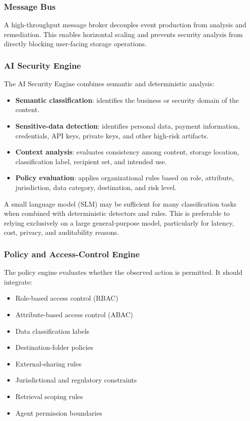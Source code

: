 \documentclass[conference]{IEEEtran}
\begin{document}
\subsubsection{Message Bus}

A high-throughput message broker decouples event production from analysis and remediation. This enables horizontal scaling and prevents security analysis from directly blocking user-facing storage operations.

\subsubsection{AI Security Engine}

The AI Security Engine combines semantic and deterministic analysis:

\begin{itemize}
  \item \textbf{Semantic classification}: identifies the business or security domain of the content.
  \item \textbf{Sensitive-data detection}: identifies personal data, payment information, credentials, API keys, private keys, and other high-risk artifacts.
  \item \textbf{Context analysis}: evaluates consistency among content, storage location, classification label, recipient set, and intended use.
  \item \textbf{Policy evaluation}: applies organizational rules based on role, attribute, jurisdiction, data category, destination, and risk level.
\end{itemize}

A small language model (SLM) may be sufficient for many classification tasks when combined with deterministic detectors and rules. This is preferable to relying exclusively on a large general-purpose model, particularly for latency, cost, privacy, and auditability reasons.

\subsubsection{Policy and Access-Control Engine}

The policy engine evaluates whether the observed action is permitted. It should integrate:

\begin{itemize}
  \item Role-based access control (RBAC)
  \item Attribute-based access control (ABAC)
  \item Data classification labels
  \item Destination-folder policies
  \item External-sharing rules
  \item Jurisdictional and regulatory constraints
  \item Retrieval scoping rules
  \item Agent permission boundaries
\end{itemize}
\end{document}
